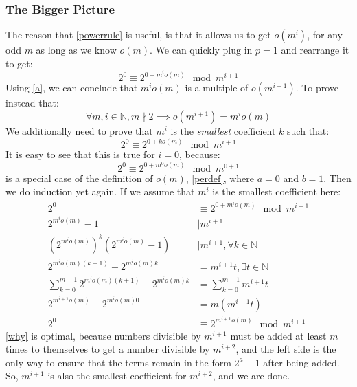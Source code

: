 \documentclass{article}
\begin{document}
  \subsubsection{The Bigger Picture}
  The reason that \eqref{powerrule} is useful, is that it allows us to get $o(m^i)$, for any odd $m$ as long as we know $o(m)$. We can quickly plug in $p = 1$ and rearrange it to get:
  \begin{equation}
    2^0 \equiv 2^{0+m^io(m)} \mod m^{i+1}
  \end{equation}
  Using \eqref{a}, we can conclude that $m^io(m)$ is a multiple of $o(m^{i+1})$. To prove instead that:
  \begin{equation}
    \forall m, i \in \mathbb{N}, m \nmid 2 \implies o(m^{i+1}) = m^io(m)
  \end{equation}
  We additionally need to prove that $m^i$ is the \emph{smallest} coefficient $k$ such that:
  \begin{equation}
    2^0 \equiv 2^{0 + ko(m)} \mod m^{i+1}
  \end{equation}
  It is easy to see that this is true for $i=0$, because:
  \begin{equation}
    2^0 \equiv 2^{0 + m^0o(m)} \mod m^{0+1}
  \end{equation}
  is a special case of the definition of $o(m)$, \eqref{perdef}, where $a=0$ and $b=1$. Then we do induction yet again. If we assume that $m^i$ is the smallest coefficient here:
  \begin{align}
    2^0 &\equiv 2^{0 + m^io(m)} \mod m^{i+1}\\
    2^{m^io(m)} - 1 &\mid m^{i+1}\\
    (2^{m^io(m)})^k(2^{m^io(m)} - 1) &\mid m^{i+1}, \forall k \in \mathbb{N}\\
    2^{m^io(m)(k+1)} - 2^{m^io(m)k} &=  m^{i+1}t, \exists t \in \mathbb{N}\\
    \sum^{m-1}_{k=0}2^{m^io(m)(k+1)} - 2^{m^io(m)k} &= \sum^{m-1}_{k=0}m^{i+1}t\label{why}\\
    2^{m^{i+1}o(m)} - 2^{m^io(m)0} &= m(m^{i+1}t)\\
    2^0 &\equiv 2^{m^{i+1}o(m)} \mod m^{i+1}
  \end{align}
  \eqref{why} is optimal, because numbers divisible by $m^{i+1}$ must be added at least $m$ times to themselves to get a number divisible by $m^{i+2}$, and the left side is the only way to ensure that the terms remain in the form $2^a-1$ after being added. So, $m^{i+1}$ is also the smallest coefficient for $m^{i+2}$, and we are done.\\
  
\end{document}
